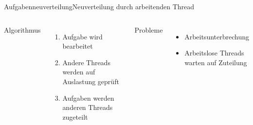 \documentclass{beamer}
\begin{document}
\begin{frame}{Aufgabenneuverteilung}{Neuverteilung durch arbeitenden Thread}
\begin{columns}

        Algorithmus
        \begin{enumerate}
        \item Aufgabe wird bearbeitet
        \item Andere Threads werden auf Auslastung gepr\"uft
        \item Aufgaben werden anderen Threads zugeteilt
        \end{enumerate}

        
        
        Probleme
        \begin{itemize}
        \item Arbeitsunterbrechung
        \item Arbeitslose Threads warten auf Zuteilung
        \end{itemize}
    
\end{columns}
\end{frame}
\end{document}
